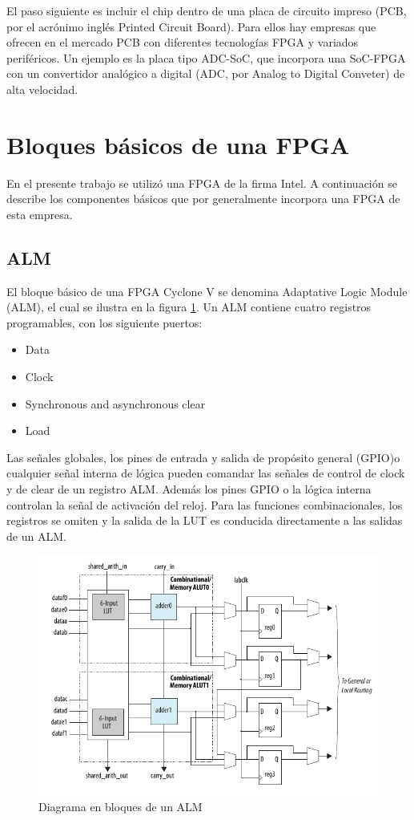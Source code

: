 El paso siguiente es incluir el chip dentro de una placa de circuito impreso (PCB, por el acrónimo inglés Printed Circuit Board). Para ellos hay empresas que ofrecen en el mercado PCB con diferentes tecnologías FPGA y variados periféricos. Un ejemplo es la placa tipo ADC-SoC, que incorpora una SoC-FPGA con un convertidor analógico a digital (ADC, por Analog to Digital Conveter) de alta velocidad.


\section{Bloques básicos de una FPGA}
En el presente trabajo se utilizó una FPGA de la firma Intel. A continuación se describe los componentes básicos que por generalmente incorpora una FPGA de esta empresa.

\subsection{ALM}

El bloque básico de una FPGA Cyclone V se denomina Adaptative Logic Module (ALM), el cual se ilustra en la figura \ref{ALM_diag_bloques}. Un ALM contiene cuatro registros programables, con los siguiente puertos:
\begin{itemize}
\item Data
\item Clock
\item Synchronous and asynchronous clear
\item Load
\end{itemize}

Las señales globales, los pines de entrada y salida de propósito general (GPIO)o cualquier señal interna de lógica pueden comandar las señales de control de clock y de clear de un registro ALM. Además los pines GPIO o la lógica interna controlan la señal de activación del reloj. Para las funciones combinacionales, los registros se omiten y la salida de la LUT es conducida directamente a las salidas de un ALM.

\begin{figure}
\centering
\includegraphics[scale=.75]{./Figures/diag_bloques_ALM.png}
\caption{Diagrama en bloques de un ALM}
\label{ALM_diag_bloques}
\end{figure}



